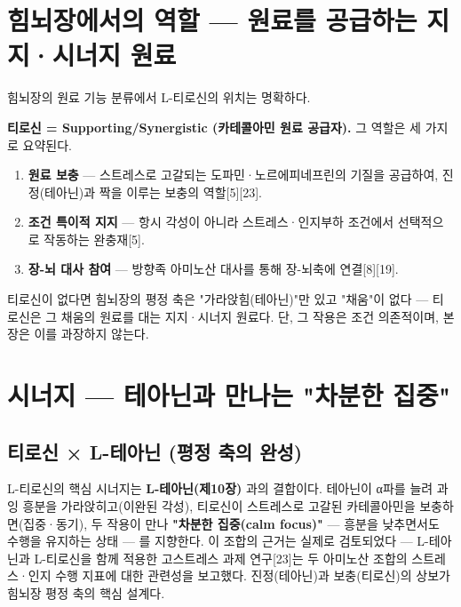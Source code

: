\documentclass[11pt,oneside]{book}
\begin{document}
\section{힘뇌장에서의 역할 — 원료를 공급하는 지지·시너지 원료}
힘뇌장의 원료 기능 분류에서 L-티로신의 위치는 명확하다.

\vspace{2pt}\vspace{3pt}

\textbf{티로신 = Supporting/Synergistic (카테콜아민 원료 공급자).} 그 역할은 세 가지로 요약된다.

\begin{enumerate}[leftmargin=6mm,itemsep=1pt,topsep=2pt]
  \item \textbf{원료 보충} — 스트레스로 고갈되는 도파민·노르에피네프린의 기질을 공급하여, 진정(테아닌)과 짝을 이루는 보충의 역할[5][23].
  \item \textbf{조건 특이적 지지} — 항시 각성이 아니라 스트레스·인지부하 조건에서 선택적으로 작동하는 완충재[5].
  \item \textbf{장-뇌 대사 참여} — 방향족 아미노산 대사를 통해 장-뇌축에 연결[8][19].
\end{enumerate}
티로신이 없다면 힘뇌장의 평정 축은 "가라앉힘(테아닌)"만 있고 "채움"이 없다 — 티로신은 그 채움의 원료를 대는 지지·시너지 원료다. 단, 그 작용은 조건 의존적이며, 본 장은 이를 과장하지 않는다.

\section{시너지 — 테아닌과 만나는 "차분한 집중"}
\subsection{티로신 × L-테아닌 (평정 축의 완성)}
L-티로신의 핵심 시너지는 \textbf{L-테아닌(제10장)} 과의 결합이다. 테아닌이 α파를 늘려 과잉 흥분을 가라앉히고(이완된 각성), 티로신이 스트레스로 고갈된 카테콜아민을 보충하면(집중·동기), 두 작용이 만나 \textbf{"차분한 집중(calm focus)"} — 흥분을 낮추면서도 수행을 유지하는 상태 — 를 지향한다. 이 조합의 근거는 실제로 검토되었다 — L-테아닌과 L-티로신을 함께 적용한 고스트레스 과제 연구[23]는 두 아미노산 조합의 스트레스·인지 수행 지표에 대한 관련성을 보고했다. 진정(테아닌)과 보충(티로신)의 상보가 힘뇌장 평정 축의 핵심 설계다.
\end{document}
